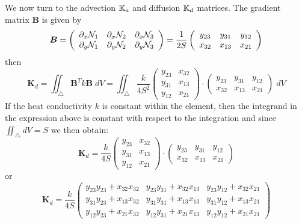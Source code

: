 We now turn to the advection ${\mathbb{K}}_a$ and diffusion ${\mathbb{K}}_d$ matrices.
The gradient matrix ${\bm B}$ is given by 
\[
{\bm B} = 
\left(
\begin{array}{ccc}
\partial_x {\mathcal{N}}_1 & \partial_x {\mathcal{N}}_2 & \partial_x {\mathcal{N}}_3 \\
\partial_y {\mathcal{N}}_1 & \partial_y {\mathcal{N}}_2 & \partial_y {\mathcal{N}}_3 \\
\end{array}
\right)
=
\frac{1}{2S}
\left(
\begin{array}{ccc}
y_{23} & y_{31} & y_{12} \\
x_{32} & x_{13} & x_{21}
\end{array}
\right)
\]
then 
\[
{\bm K}_d 
= \iint_\triangle {\bm B}^T k {\bm B} \; dV
= \iint_\triangle \frac{k}{4S^2}
\left(
\begin{array}{cc}
y_{23} & x_{32} \\ 
y_{31} & x_{13} \\
y_{12} & x_{21}
\end{array}
\right)
\cdot
\left(
\begin{array}{ccc}
y_{23} & y_{31} & y_{12} \\
x_{32} & x_{13} & x_{21}
\end{array}
\right)
\; dV
\]
If the heat conductivity $k$ is constant within the element, then 
the integrand in the expression above is constant with respect to the 
integration and since $\iint_\triangle dV = S$ we then obtain:
\[
{\bm K}_d 
= \frac{k}{4S}
\left(
\begin{array}{cc}
y_{23} & x_{32} \\ 
y_{31} & x_{13} \\
y_{12} & x_{21}
\end{array}
\right)
\cdot
\left(
\begin{array}{ccc}
y_{23} & y_{31} & y_{12} \\
x_{32} & x_{13} & x_{21}
\end{array}
\right)
\]
or
\[
\boxed{
{\bm K}_d 
= \frac{k}{4S}
\left(
\begin{array}{ccc}
y_{23}y_{23} + x_{32}x_{32} & y_{23}y_{31} + x_{32}x_{13} & y_{23}y_{12} + x_{32}x_{21}  \\ 
y_{31}y_{23} + x_{13}x_{32} & y_{31}y_{31} + x_{13}x_{13} & y_{31}y_{12} + x_{13}x_{21}  \\ 
y_{12}y_{23} + x_{21}x_{32} & y_{12}y_{31} + x_{21}x_{13} & y_{12}y_{12} + x_{21}x_{21} 
\end{array}
\right)
}
\]


